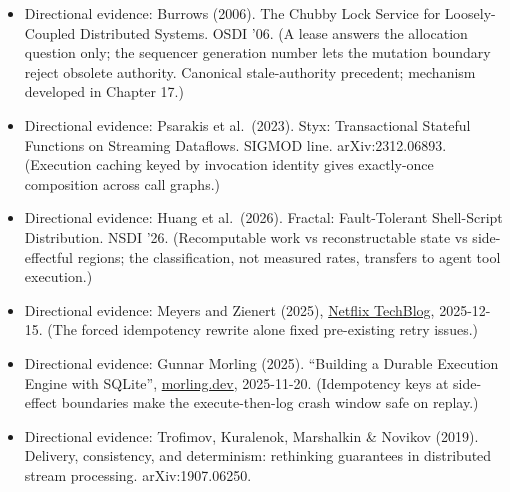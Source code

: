 \begin{itemize}
\tightlist
\item
  Directional evidence: Burrows (2006). The Chubby Lock Service for Loosely-Coupled Distributed Systems. OSDI '06. (A lease answers the allocation question only; the sequencer generation number lets the mutation boundary reject obsolete authority. Canonical stale-authority precedent; mechanism developed in Chapter 17.)
\item
  Directional evidence: Psarakis et al.~(2023). Styx: Transactional Stateful Functions on Streaming Dataflows. SIGMOD line. arXiv:2312.06893. (Execution caching keyed by invocation identity gives exactly-once composition across call graphs.)
\item
  Directional evidence: Huang et al.~(2026). Fractal: Fault-Tolerant Shell-Script Distribution. NSDI '26. (Recomputable work vs reconstructable state vs side-effectful regions; the classification, not measured rates, transfers to agent tool execution.)
\item
  Directional evidence: Meyers and Zienert (2025), \href{https://netflixtechblog.com/how-temporal-powers-reliable-cloud-operations-at-netflix-73c69ccb5953}{Netflix TechBlog}, 2025-12-15. (The forced idempotency rewrite alone fixed pre-existing retry issues.)
\item
  Directional evidence: Gunnar Morling (2025). ``Building a Durable Execution Engine with SQLite'', \href{https://www.morling.dev/blog/building-durable-execution-engine-with-sqlite/}{morling.dev}, 2025-11-20. (Idempotency keys at side-effect boundaries make the execute-then-log crash window safe on replay.)
\item
  Directional evidence: Trofimov, Kuralenok, Marshalkin \& Novikov (2019). Delivery, consistency, and determinism: rethinking guarantees in distributed stream processing. arXiv:1907.06250.
\end{itemize}
